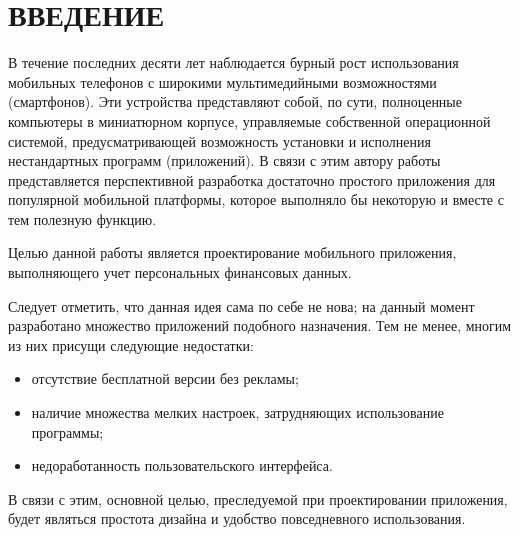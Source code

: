 \section*{ВВЕДЕНИЕ}

В течение последних десяти лет наблюдается бурный рост
использования мобильных телефонов с широкими мультимедийными
возможностями (смартфонов). Эти устройства представляют собой,
по сути, полноценные компьютеры в миниатюрном корпусе,
управляемые собственной операционной системой,
предусматривающей возможность установки и исполнения
нестандартных программ (приложений).
В связи с этим автору работы представляется перспективной разработка
достаточно простого приложения для популярной мобильной платформы,
которое выполняло бы некоторую и вместе с тем полезную функцию.

Целью данной работы является проектирование мобильного приложения,
выполняющего учет персональных финансовых данных.

Следует отметить, что данная идея сама по себе не нова;
на данный момент разработано множество приложений подобного назначения.
Тем не менее, многим из них присущи следующие недостатки:
\begin{itemize}
\item отсутствие бесплатной версии без рекламы;
\item наличие множества мелких настроек, затрудняющих использование программы;
\item недоработанность пользовательского интерфейса.
\end{itemize}

В связи с этим, основной целью, преследуемой при проектировании приложения,
будет являться простота дизайна и удобство повседневного использования.
